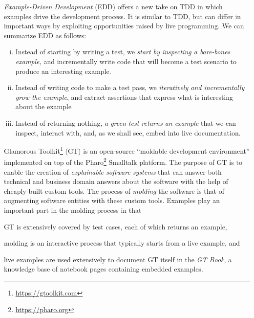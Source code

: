 \documentclass[acmsmall,screen,authorversion,nonacm]{acmart} %
\begin{document}
\emph{Example-Driven Development} (EDD) offers a new take on TDD in which examples drive the development process.
It is similar to TDD, but can differ in important ways by exploiting opportunities raised by live programming.
We can summarize EDD as follows:
\begin{enumerate}[(i)]
	\item Instead of starting by writing a test, we \emph{start by inspecting a bare-bones example,} and incrementally write code that will become a test scenario to produce an interesting example.
	\item Instead of writing code to make a test pass, we \emph{iteratively and incrementally grow the example}, and extract assertions that express what is interesting about the example
	\item Instead of returning nothing, \emph{a green test returns an example} that we can inspect, interact with, and, as we shall see, embed into live documentation.
\end{enumerate}



Glamorous Toolkit\footnote{\url{https://gtoolkit.com}} (GT) is an open-source ``moldable development environment'' implemented on top of the Pharo\footnote{\url{https://pharo.org}} Smalltalk  platform.
The purpose of GT is to enable the creation of \emph{explainable software systems} that can answer both technical and business domain answers about the software with the help of cheaply-built custom tools.
The process of \emph{molding} the software is that of augmenting software entities with these custom tools.
Examples play an important part in the molding process in that
\begin{inparaenum}[(i)]
	\item GT is extensively covered by test cases, each of which returns an example,
	\item molding is an interactive process that typically starts from a live example, and
	\item live examples are used extensively to document GT itself in the \emph{GT Book}, a knowledge base of notebook pages containing embedded examples.
\end{inparaenum}
\end{document}

